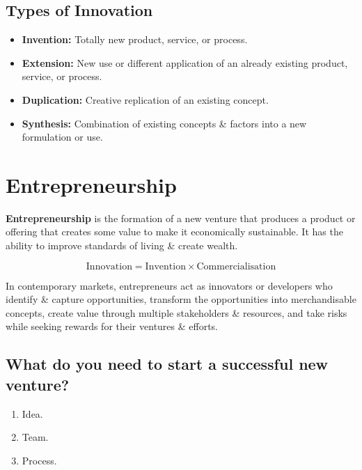 \documentclass[a4paper,11pt]{article}
\begin{document}
\subsection{Types of Innovation}
\begin{itemize}
    \item   \textbf{Invention:} Totally new product, service, or process.
    \item   \textbf{Extension:} New use or different application of an already existing product, service, or process.
    \item   \textbf{Duplication:} Creative replication of an existing concept.
    \item   \textbf{Synthesis:} Combination of existing concepts \& factors into a new formulation or use.
\end{itemize}

\section{Entrepreneurship}
\textbf{Entrepreneurship} is the formation of a new venture that produces a product or offering that creates some value to 
make it economically sustainable.
It has the ability to improve standards of living \& create wealth.

$$
\text{Innovation} = \text{Invention} \times \text{Commercialisation}
$$

In contemporary markets, entrepreneurs act as innovators or developers who identify \& capture opportunities, transform 
the opportunities into merchandisable concepts, create value through multiple stakeholders \& resources, and take risks 
while seeking rewards for their ventures \& efforts.


\subsection{What do you need to start a successful new venture?}
\begin{enumerate}
    \item   Idea.
    \item   Team.
    \item   Process.
\end{enumerate}
\end{document}

